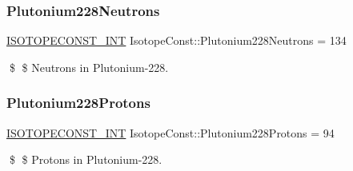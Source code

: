 \subsubsection{\texorpdfstring{Plutonium228\+Neutrons}{Plutonium228Neutrons}}
{\footnotesize\ttfamily \mbox{\hyperlink{group___isotope_const-_macros_ga5f18360b3e99483a35c32d789e62621c}{I\+S\+O\+T\+O\+P\+E\+C\+O\+N\+S\+T\+\_\+\+I\+NT}} Isotope\+Const\+::\+Plutonium228\+Neutrons = 134}

\$ \$ Neutrons in Plutonium-\/228. \mbox{\label{group___isotope_const-_plutonium-_pu228_ga23b98c9ffd0481981bbc0026b41c9295}} 
\subsubsection{\texorpdfstring{Plutonium228\+Protons}{Plutonium228Protons}}
{\footnotesize\ttfamily \mbox{\hyperlink{group___isotope_const-_macros_ga5f18360b3e99483a35c32d789e62621c}{I\+S\+O\+T\+O\+P\+E\+C\+O\+N\+S\+T\+\_\+\+I\+NT}} Isotope\+Const\+::\+Plutonium228\+Protons = 94}

\$ \$ Protons in Plutonium-\/228. 